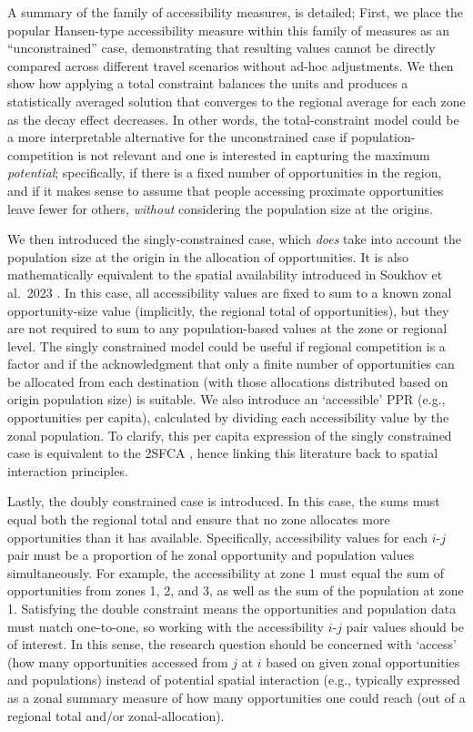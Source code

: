 \documentclass[
  10pt,
  letterpaper,
]{article}
\begin{document}
A summary of the family of accessibility measures, is detailed; First,
we place the popular Hansen-type accessibility measure
\citep{hansen1959} within this family of measures as an
``unconstrained'' case, demonstrating that resulting values cannot be
directly compared across different travel scenarios without ad-hoc
adjustments. We then show how applying a total constraint balances the
units and produces a statistically averaged solution that converges to
the regional average for each zone as the decay effect decreases. In
other words, the total-constraint model could be a more interpretable
alternative for the unconstrained case if population-competition is not
relevant and one is interested in capturing the maximum
\emph{potential}; specifically, if there is a fixed number of
opportunities in the region, and if it makes sense to assume that people
accessing proximate opportunities leave fewer for others, \emph{without}
considering the population size at the origins.

We then introduced the singly-constrained case, which \emph{does} take
into account the population size at the origin in the allocation of
opportunities. It is also mathematically equivalent to the spatial
availability introduced in Soukhov et al.~2023
\citep{soukhovIntroducingSpatialAvailability2023}. In this case, all
accessibility values are fixed to sum to a known zonal opportunity-size
value (implicitly, the regional total of opportunities), but they are
not required to sum to any population-based values at the zone or
regional level. The singly constrained model could be useful if regional
competition is a factor and if the acknowledgment that only a finite
number of opportunities can be allocated from each destination (with
those allocations distributed based on origin population size) is
suitable. We also introduce an `accessible' PPR (e.g., opportunities per
capita), calculated by dividing each accessibility value by the zonal
population. To clarify, this per capita expression of the singly
constrained case is equivalent to the 2SFCA \citep{luo2003, shen1998},
hence linking this literature back to spatial interaction principles.

Lastly, the doubly constrained case is introduced. In this case, the
sums must equal both the regional total and ensure that no zone
allocates more opportunities than it has available. Specifically,
accessibility values for each \(i\)-\(j\) pair must be a proportion of
he zonal opportunity and population values simultaneously. For example,
the accessibility at zone 1 must equal the sum of opportunities from
zones 1, 2, and 3, as well as the sum of the population at zone 1.
Satisfying the double constraint means the opportunities and population
data must match one-to-one, so working with the accessibility
\(i\)-\(j\) pair values should be of interest. In this sense, the
research question should be concerned with `access' (how many
opportunities accessed from \(j\) at \(i\) based on given zonal
opportunities and populations) instead of potential spatial interaction
(e.g., typically expressed as a zonal summary measure of how many
opportunities one could reach (out of a regional total and/or
zonal-allocation).
\end{document}
